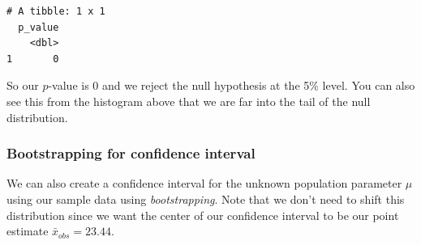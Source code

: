 \documentclass[12pt, krantz2,]{krantz}
\makeatletter
\newenvironment{Shaded}{\begin{snugshade}}{\end{snugshade}}
\newcommand{\DataTypeTok}[1]{\textcolor[rgb]{0.27,0.27,0.27}{#1}}
\newcommand{\DecValTok}[1]{\textcolor[rgb]{0.06,0.06,0.06}{#1}}
\newcommand{\KeywordTok}[1]{\textcolor[rgb]{0.27,0.27,0.27}{\textbf{#1}}}
\newcommand{\NormalTok}[1]{#1}
\newcommand{\OperatorTok}[1]{\textcolor[rgb]{0.43,0.43,0.43}{\textbf{#1}}}
\newcommand{\StringTok}[1]{\textcolor[rgb]{0.5,0.5,0.5}{#1}}
\newenvironment{kframe}{%
\medskip{}
\setlength{\fboxsep}{.8em}
 \def\at@end@of@kframe{}%
 \ifinner\ifhmode%
  \def\at@end@of@kframe{\end{minipage}}%
  \begin{minipage}{\columnwidth}%
 \fi\fi%
 \def\FrameCommand##1{\hskip\@totalleftmargin \hskip-\fboxsep
 \colorbox{shadecolor}{##1}\hskip-\fboxsep
     \hskip-\linewidth \hskip-\@totalleftmargin \hskip\columnwidth}%
 \MakeFramed {\advance\hsize-\width
   \@totalleftmargin\z@ \linewidth\hsize
   \@setminipage}}%
 {\par\unskip\endMakeFramed%
 \at@end@of@kframe}
\renewenvironment{Shaded}{\begin{kframe}}{\end{kframe}}
\makeatother
\begin{document}
\begin{Shaded}
\end{Shaded}

\begin{verbatim}
# A tibble: 1 x 1
  p_value
    <dbl>
1       0
\end{verbatim}

So our \(p\)-value is 0 and we reject the null hypothesis at the 5\% level. You can also see this from the histogram above that we are far into the tail of the null distribution.

\hypertarget{bootstrapping-for-confidence-interval}{%
\subsubsection*{Bootstrapping for confidence interval}\label{bootstrapping-for-confidence-interval}}


We can also create a confidence interval for the unknown population parameter \(\mu\) using our sample data using \emph{bootstrapping}. Note that we don't need to shift this distribution since we want the center of our confidence interval to be our point estimate \(\bar{x}_{obs} = 23.44\).

\begin{Shaded}
\end{Shaded}

\begin{Shaded}
\end{Shaded}
\end{document}

